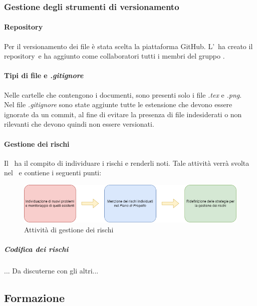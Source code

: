     \subsubsection{Gestione degli strumenti di versionamento}
      \paragraph{Repository\glo}
        Per il versionamento dei file è stata scelta la piattaforma GitHub\glo. L'\roleAdministratorLow\ ha creato il repository\glo\ e ha aggiunto 
        come collaboratori tutti i membri del gruppo \groupName.

      \paragraph{Tipi di file e \textit{.gitignore}}
        Nelle cartelle che contengono i documenti, sono presenti solo i file \textit{.tex} e \textit{.png}.\\
        Nel file \textit{.gitignore} sono state aggiunte tutte le estensione che devono essere ignorate da un commit, al fine di evitare la presenza di file indesiderati 
        o non rilevanti che devono quindi non essere versionati.
    \paragraph {Gestione dei rischi}
      Il \roleProjectManagerLow\ ha il compito di individuare i rischi e renderli noti. Tale attività verrà svolta nel \docNamePdPLow\ e contiene i seguenti punti:
      \begin{figure}[htbp]
        \centering 
         \includegraphics[scale =0.7]{../template/images/NdP/GestioneRischi.png}
         \caption{Attività di gestione dei rischi}
      \end {figure}
      
      \subparagraph {Codifica dei rischi}
        ... Da discuterne con gli altri...



        \subsection{Formazione} \label{subsection: formazione}

